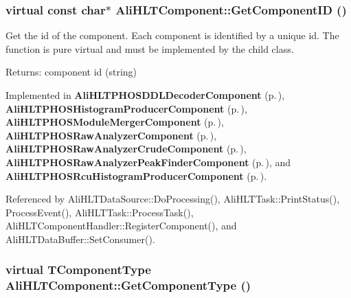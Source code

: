 \subsubsection{\setlength{\rightskip}{0pt plus 5cm}virtual const char$\ast$ Ali\-HLTComponent::Get\-Component\-ID ()\hspace{0.3cm}{\tt  [pure virtual]}}\label{classAliHLTComponent_a9}


Get the id of the component. Each component is identified by a unique id. The function is pure virtual and must be implemented by the child class. \begin{Desc}
\item[Returns:]component id (string) \end{Desc}


Implemented in {\bf Ali\-HLTPHOSDDLDecoder\-Component} {\rm (p.\,\pageref{classAliHLTPHOSDDLDecoderComponent_a10})}, {\bf Ali\-HLTPHOSHistogram\-Producer\-Component} {\rm (p.\,\pageref{classAliHLTPHOSHistogramProducerComponent_a10})}, {\bf Ali\-HLTPHOSModule\-Merger\-Component} {\rm (p.\,\pageref{classAliHLTPHOSModuleMergerComponent_a10})}, {\bf Ali\-HLTPHOSRaw\-Analyzer\-Component} {\rm (p.\,\pageref{classAliHLTPHOSRawAnalyzerComponent_a12})}, {\bf Ali\-HLTPHOSRaw\-Analyzer\-Crude\-Component} {\rm (p.\,\pageref{classAliHLTPHOSRawAnalyzerCrudeComponent_a4})}, {\bf Ali\-HLTPHOSRaw\-Analyzer\-Peak\-Finder\-Component} {\rm (p.\,\pageref{classAliHLTPHOSRawAnalyzerPeakFinderComponent_a2})}, and {\bf Ali\-HLTPHOSRcu\-Histogram\-Producer\-Component} {\rm (p.\,\pageref{classAliHLTPHOSRcuHistogramProducerComponent_a10})}.

Referenced by Ali\-HLTData\-Source::Do\-Processing(), Ali\-HLTTask::Print\-Status(), Process\-Event(), Ali\-HLTTask::Process\-Task(), Ali\-HLTComponent\-Handler::Register\-Component(), and Ali\-HLTData\-Buffer::Set\-Consumer().
\subsubsection{\setlength{\rightskip}{0pt plus 5cm}virtual {\bf TComponent\-Type} Ali\-HLTComponent::Get\-Component\-Type ()\hspace{0.3cm}{\tt  [pure virtual]}}\label{classAliHLTComponent_a8}


